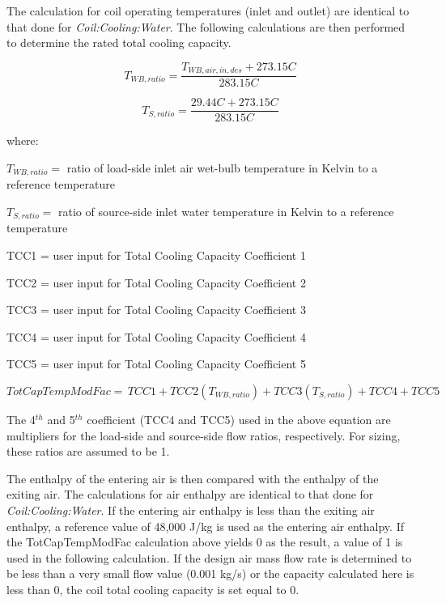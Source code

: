 The calculation for coil operating temperatures (inlet and outlet) are identical to that done for \emph{Coil:Cooling:Water}. The following calculations are then performed to determine the rated total cooling capacity.

\begin{equation}
  T_{WB,ratio} = \frac{T_{WB,air,in,des}+273.15C}{283.15C}
\end{equation}

\begin{equation}
  T_{S,ratio} = \frac{29.44C+273.15C}{283.15C}
\end{equation}

where:

$T_{WB,ratio} = $ ratio of load-side inlet air wet-bulb temperature in Kelvin to a reference temperature

$T_{S,ratio} = $ ratio of source-side inlet water temperature in Kelvin to a reference temperature

TCC1 = user input for Total Cooling Capacity Coefficient 1

TCC2 = user input for Total Cooling Capacity Coefficient 2

TCC3 = user input for Total Cooling Capacity Coefficient 3

TCC4 = user input for Total Cooling Capacity Coefficient 4

TCC5 = user input for Total Cooling Capacity Coefficient 5

\begin{equation}
TotCapTempModFac = \,TCC1 + TCC2\left( {{T_{WB,ratio}}} \right) + TCC3\left( {{T_{S,ratio}}} \right) + TCC4 + TCC5
\end{equation}

The 4\(^{th}\) and 5\(^{th}\) coefficient (TCC4 and TCC5) used in the above equation are multipliers for the load-side and source-side flow ratios, respectively. For sizing, these ratios are assumed to be 1.

The enthalpy of the entering air is then compared with the enthalpy of the exiting air. The calculations for air enthalpy are identical to that done for \emph{Coil:Cooling:Water}. If the entering air enthalpy is less than the exiting air enthalpy, a reference value of 48,000 J/kg is used as the entering air enthalpy. If the TotCapTempModFac calculation above yields 0 as the result, a value of 1 is used in the following calculation. If the design air mass flow rate is determined to be less than a very small flow value (0.001 kg/s) or the capacity calculated here is less than 0, the coil total cooling capacity is set equal to 0.

